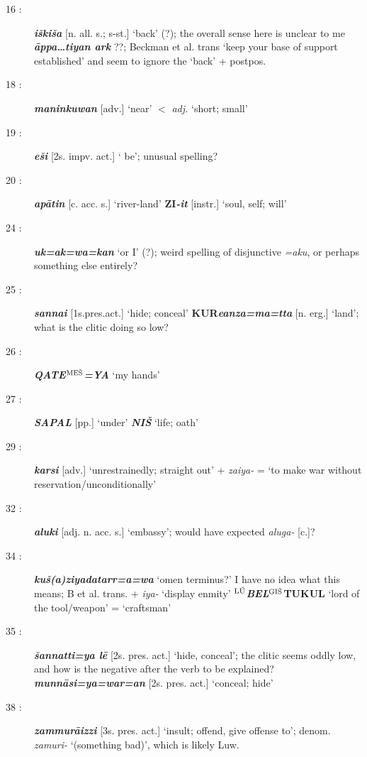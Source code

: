 \documentclass[10pt]{article}
\newcommand{\supersc}[1]{$^{\textrm{\scriptsize{#1}}}$}  	%
\newcommand{\bit}[1]{\textbf{\textit{#1}}}				%
\newcommand{\p}[1]{{\tiny[{#1}]}}					%
\newcommand{\hith}{\textsubwedge{h}}
\newcommand{\man}{\supersc{L\'U}}
\newcommand{\mpl}{\supersc{ME\v{S}}}
\newcommand{\wood}{\supersc{GI\v{S}}}
\renewcommand{\.}[1]{\textsubdot{#1}}
\begin{document}
\begin{description}
\item[16 :] \bit{i\v{s}ki\v{s}a} \p{n. all. s.; s-st.} `back' (?);  the overall sense here is unclear to me \bit{\=appa{\ldots}tiyan {\hith}ark} ??; Beckman et al. trans `keep your base of support established' and seem to ignore the `back' + postpos.

\item[18 :] \bit{maninkuwan} \p{adv.} `near' $<$ \textit{adj.} `short; small' 

\item[19 :] \bit{e\v{s}i} \p{2s. impv. act.} ` be'; unusual spelling?

\item[20 :] \bit{{\hith}ap\=atin} \p{c. acc. s.} `river-land' \textbf{ZI\bit{-it}} \p{instr.} `soul, self; will'

\item[24 :] \bit{uk=ak=wa=kan} `or I' (?); weird spelling of disjunctive \textit{=aku}, or perhaps something else entirely?

\item[25 :] \bit{sanna{\hith\hith}i} \p{1s.pres.act.} `hide; conceal' \textbf{KUR}\bit{eanza=ma=tta} \p{n. erg.} `land'; what is the clitic doing so low?

\item[26 :] \bit{QATE}\textbf{\mpl}\bit{=YA} `my hands'

\item[27 :] \bit{SAPAL} \p{pp.} `under' \bit{NI\v{S}} `life; oath'

\item[29 :] \bit{karsi} \p{adv.} `unrestrainedly; straight out' + \textit{za{\hith\hith}iya-} = `to make war without reservation/unconditionally'

\item[32 :] \bit{{\hith}aluki} \p{adj. n. acc. s.} `embassy'; would have expected \textit{{\hith}aluga-} \p{c.}?

\item[34 :] \bit{ku\v{s}(a)ziyadatarr=a=wa} `omen terminus?' I have no idea what this means; B et al. trans. + \textit{iya-} `display enmity' \textbf{\man}\bit{BEL}\textbf{{\wood}TUKUL} `lord of the tool/weapon' = `craftsman'

\item[35 :] \bit{\v{s}annatti=ya l\=e} \p{2s. pres. act.} `hide, conceal'; the clitic seems oddly low, and how is the negative after the verb to be explained? \bit{munn\=asi=ya=war=an} \p{2s. pres. act.} `conceal; hide'

\item[38 :] \bit{zammur\=aizzi} \p{3s. pres. act.} `insult; offend, give offense to'; denom. \textit{zamuri-} `(something bad)', which is likely Luw.


\end{description}
\end{document}
